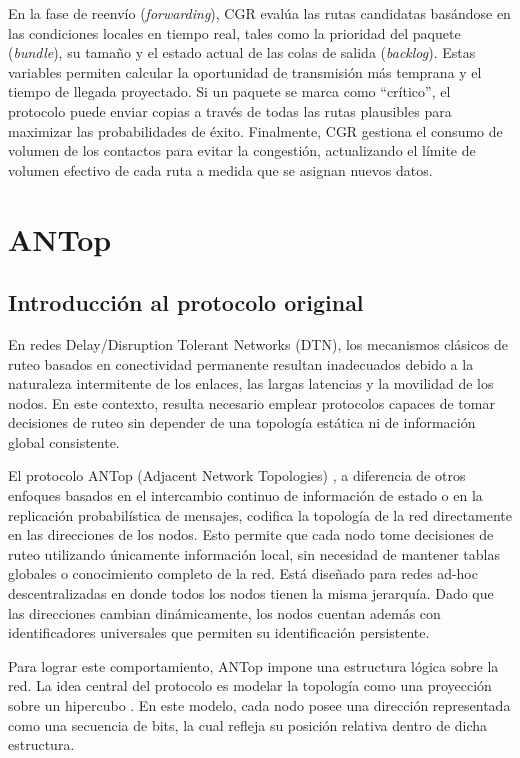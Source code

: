 En la fase de reenvío (\textit{forwarding}), CGR evalúa las rutas candidatas basándose en las condiciones locales en tiempo real, tales como la prioridad del paquete (\textit{bundle}), su tamaño y el estado actual de las colas de salida (\textit{backlog}). Estas variables permiten calcular la oportunidad de transmisión más temprana  y el tiempo de llegada proyectado. Si un paquete se marca como ``crítico'', el protocolo puede enviar copias a través de todas las rutas plausibles para maximizar las probabilidades de éxito. Finalmente, CGR gestiona el consumo de volumen de los contactos para evitar la congestión, actualizando el límite de volumen efectivo de cada ruta a medida que se asignan nuevos datos.

\section{ANTop}
\subsection{Introducción al protocolo original}
En redes Delay/Disruption Tolerant Networks (DTN), los mecanismos clásicos de ruteo basados en conectividad permanente resultan inadecuados debido a la naturaleza intermitente de los enlaces, las largas latencias y la movilidad de los nodos. En este contexto, resulta necesario emplear protocolos capaces de tomar decisiones de ruteo sin depender de una topología estática ni de información global consistente.

El protocolo ANTop (Adjacent Network Topologies) \cite{marcu2007antop} \cite{torrado2018fragmentacion} \cite{campolo2012estudio}, a diferencia de otros enfoques basados en el intercambio continuo de información de estado o en la replicación probabilística de mensajes, codifica la topología de la red directamente en las direcciones de los nodos. Esto permite que cada nodo tome decisiones de ruteo utilizando únicamente información local, sin necesidad de mantener tablas globales o conocimiento completo de la red. Está diseñado para redes ad-hoc descentralizadas en donde todos los nodos tienen la misma jerarquía. Dado que las direcciones cambian dinámicamente, los nodos cuentan además con identificadores universales que permiten su identificación persistente.

Para lograr este comportamiento, ANTop impone una estructura lógica sobre la red. La idea central del protocolo es modelar la topología como una proyección sobre un hipercubo \cite{alvarezhamelin_dht_hypercubes}. En este modelo, cada nodo posee una dirección representada como una secuencia de bits, la cual refleja su posición relativa dentro de dicha estructura.

